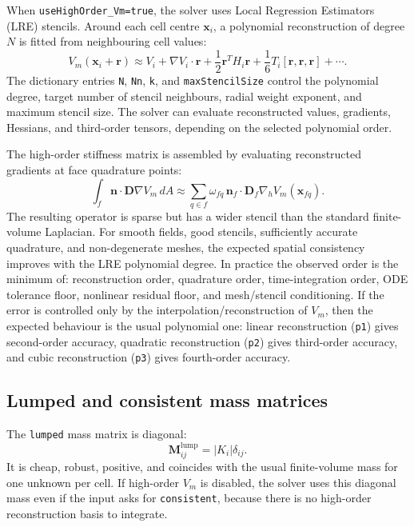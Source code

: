 \documentclass[11pt,a4paper]{article}
\newcommand{\code}[1]{\texttt{\small #1}}
\newcommand{\Vm}{V_m}
\newcommand{\Dten}{\mathbf{D}}
\newcommand{\grad}{\nabla}
\newcommand{\Mmass}{\mathbf{M}}
\begin{document}
When \code{useHighOrder\_Vm=true}, the solver uses Local
Regression Estimators (LRE) stencils. Around each cell centre $\mathbf{x}_i$, a polynomial
reconstruction of degree $N$ is fitted from neighbouring cell values:
\begin{equation}
  \Vm(\mathbf{x}_i+\mathbf{r})
  \approx
  V_i
  + \grad V_i\cdot\mathbf{r}
  + \frac{1}{2}\mathbf{r}^{T}H_i\mathbf{r}
  + \frac{1}{6}T_i[\mathbf{r},\mathbf{r},\mathbf{r}]
  + \cdots.
  \label{eq:lre-taylor}
\end{equation}
The dictionary entries \code{N}, \code{Nn}, \code{k}, and
\code{maxStencilSize} control the polynomial degree, target number of stencil
neighbours, radial weight exponent, and maximum stencil size. The solver can
evaluate reconstructed values, gradients, Hessians, and third-order tensors,
depending on the selected polynomial order.

The high-order stiffness matrix is assembled by evaluating reconstructed
gradients at face quadrature points:
\begin{equation}
  \int_f \mathbf{n}\cdot\Dten\grad\Vm\,dA
  \approx
  \sum_{q\in f}\omega_{fq}\,
  \mathbf{n}_f\cdot\Dten_f
  \grad_h \Vm(\mathbf{x}_{fq}).
  \label{eq:ho-face}
\end{equation}
The resulting operator is sparse but has a wider stencil than the standard
finite-volume Laplacian. For smooth fields, good stencils, sufficiently accurate
quadrature, and non-degenerate meshes, the expected spatial consistency improves
with the LRE polynomial degree. In practice the observed order is the minimum
of: reconstruction order, quadrature order, time-integration order, ODE
tolerance floor, nonlinear residual floor, and mesh/stencil conditioning.
If the error is controlled only by the interpolation/reconstruction of $\Vm$,
then the expected behaviour is the usual polynomial one: linear reconstruction
(\code{p1}) gives second-order accuracy, quadratic reconstruction (\code{p2})
gives third-order accuracy, and cubic reconstruction (\code{p3}) gives
fourth-order accuracy.

\subsection{Lumped and consistent mass matrices}

The \code{lumped} mass matrix is diagonal:
\begin{equation}
  \Mmass^{\mathrm{lump}}_{ij}
  =
  |K_i|\delta_{ij}.
  \label{eq:lumped}
\end{equation}
It is cheap, robust, positive, and coincides with the usual finite-volume mass
for one unknown per cell. If high-order $\Vm$ is disabled, the solver uses this
diagonal mass even if the input asks for \code{consistent}, because there is no
high-order reconstruction basis to integrate.
\end{document}
